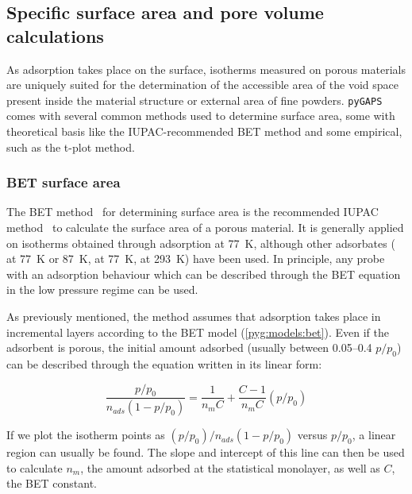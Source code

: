 
\subsection{Specific surface area and pore volume calculations}

As adsorption takes place on the surface,
isotherms measured on porous materials are uniquely suited
for the determination of the accessible area of the void
space present inside the material structure or external
area of fine powders. \texttt{pyGAPS} comes with several
common methods used to
determine surface area, some with theoretical basis like
the IUPAC-recommended BET method and some empirical, such
as the t-plot method.

\subsubsection{BET surface area}\label{pyg:charac:betarea}

The BET method~\cite{brunauerAdsorptionGasesMultimolecular1938}
for determining surface area is the recommended IUPAC method~\cite{thommesPhysisorptionGasesSpecial2015}
to calculate the surface area of a porous material.
It is generally applied on isotherms obtained through 
adsorption at \SI{77}{\kelvin}, although other adsorbates
( at \SI{77}{\kelvin} or \SI{87}{\kelvin},
 at \SI{77}{\kelvin},  at \SI{293}{\kelvin})
have been used. In principle, any probe with an adsorption behaviour
which can be described through the BET equation in the low pressure regime
can be used.

As previously mentioned, the method assumes that adsorption takes place
in incremental layers according to the
BET model (\ref{pyg:models:bet}).
Even if the adsorbent is porous, the initial amount adsorbed
(usually between 0.05--0.4 \(p/p_0\)) can be
described through the equation written in its linear form:

\begin{equation}
	\frac{p/p_0}{n_{ads} (1-p/p_0)} = \frac{1}{n_{m} C} + \frac{C - 1}{n_{m} C}(p/p_0)
\end{equation}

If we plot the isotherm points as
\({(p/p_0)}/{n_{ads}(1-p/p_0)}\) versus \(p/p_0\), a linear region
can usually be found. The slope and intercept of this line
can then be used to calculate \(n_{m}\), the amount adsorbed at the
statistical monolayer, as well as \(C\), the BET constant.


